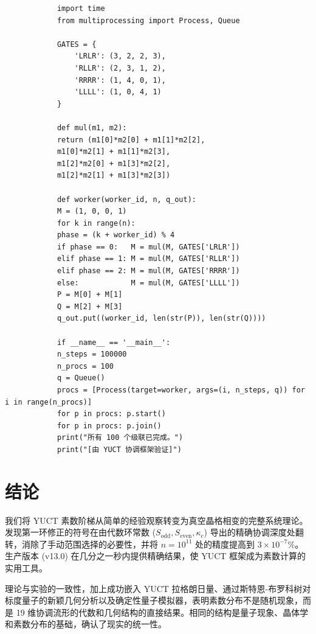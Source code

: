 \documentclass[11pt,a4paper]{article}
\newcommand{\kappac}{\kappa_c}
\newcommand{\Sodd}{S_{\mathrm{odd}}}
\newcommand{\Seven}{S_{\mathrm{even}}}
\begin{document}
	\begin{tcolorbox}[title=并行级联基准测试 (Python), breakable]
		\begin{lstlisting}
			import time
			from multiprocessing import Process, Queue
			
			GATES = {
				'LRLR': (3, 2, 2, 3),
				'RLLR': (2, 3, 1, 2),
				'RRRR': (1, 4, 0, 1),
				'LLLL': (1, 0, 4, 1)
			}
			
			def mul(m1, m2):
			return (m1[0]*m2[0] + m1[1]*m2[2],
			m1[0]*m2[1] + m1[1]*m2[3],
			m1[2]*m2[0] + m1[3]*m2[2],
			m1[2]*m2[1] + m1[3]*m2[3])
			
			def worker(worker_id, n, q_out):
			M = (1, 0, 0, 1)
			for k in range(n):
			phase = (k + worker_id) % 4
			if phase == 0:   M = mul(M, GATES['LRLR'])
			elif phase == 1: M = mul(M, GATES['RLLR'])
			elif phase == 2: M = mul(M, GATES['RRRR'])
			else:            M = mul(M, GATES['LLLL'])
			P = M[0] + M[1]
			Q = M[2] + M[3]
			q_out.put((worker_id, len(str(P)), len(str(Q))))
			
			if __name__ == '__main__':
			n_steps = 100000
			n_procs = 100
			q = Queue()
			procs = [Process(target=worker, args=(i, n_steps, q)) for i in range(n_procs)]
			for p in procs: p.start()
			for p in procs: p.join()
			print("所有 100 个级联已完成。")
			print("[由 YUCT 协调框架验证]")
		\end{lstlisting}
	\end{tcolorbox}
	
	\section{结论}
	\label{sec:conclusion}
	我们将 YUCT 素数阶梯从简单的经验观察转变为真空晶格相变的完整系统理论。发现第一环修正的符号在由代数环常数 (\(\Sodd,\Seven,\kappac\)) 导出的精确协调深度处翻转，消除了手动范围选择的必要性，并将 \(n=10^{11}\) 处的精度提高到 \(3\times10^{-7}\%\)。生产版本 (v13.0) 在几分之一秒内提供精确结果，使 YUCT 框架成为素数计算的实用工具。
	
	理论与实验的一致性，加上成功嵌入 YUCT 拉格朗日量、通过斯特恩-布罗科树对标度量子的新颖几何分析以及确定性量子模拟器，表明素数分布不是随机现象，而是 19 维协调流形的代数和几何结构的直接结果。相同的结构是量子现象、晶体学和素数分布的基础，确认了现实的统一性。
	
\end{document}
